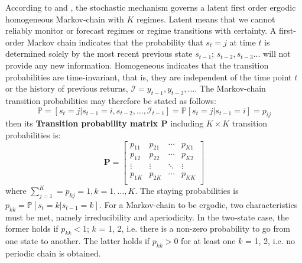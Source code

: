 \documentclass[12pt,a4paper]{article}
\begin{document}
According to \cite{hamilton1994autoregressive} and \cite{paolella2012mixture}, the stochastic mechanism governs a latent first order ergodic homogeneous Markov-chain with $K$ regimes. Latent means that we cannot reliably monitor or forecast regimes or regime transitions with certainty. A first-order Markov chain indicates that the probability that $s_t = j$ at time $t$ is determined solely by the most recent previous state $s_{t-1}$; $s_{t-2}, s_{t-3}...$ will not provide any new information. Homogeneous indicates that the transition probabilities are time-invariant, that is, they are independent of the time point $t$ or the history of previous returns, $\mathcal{I} = {y_{t-1}, y_{t-2}, \ldots}$. The Markov-chain transition probabilities may therefore be stated as follows:
\begin{equation}
    \mathbb{P} = [s_t = j \vert s_{t-1} = i, s_{t-2}, \ldots, \mathcal{I}_{t-1}] = \mathbb{P} [s_t = j \vert s_{t-1} = i] = p_{ij}  
\end{equation}
then its \textbf{Transition probability matrix P} including $K\times K$ transition probabilities is:
\begin{equation}
    \textbf{P} = \left[ {\begin{array}{cccc}
    p_{11} & p_{21} & \cdots & p_{K1}\\
    p_{12} & p_{22} & \cdots & p_{K2}\\
    \vdots & \vdots & \ddots & \vdots\\
    p_{1K} & p_{2K} & \cdots & p_{KK}\\
  \end{array} } \right]
\end{equation}
where $\sum_{j=1}^{K} = p_{kj} = 1, k = 1, \ldots , K$. The staying probabilities is $p_{kk} = \mathbb{P} [s_t = k \vert s_{t-1} = k]$. For a Markov-chain to be ergodic, two characteristics must be met, namely irreducibility and aperiodicity. In the two-state case, the former holds if $p_{kk} < 1$; $k$ = 1, 2, i.e. there is a non-zero probability to go from one state to another. The latter holds if $p_{kk} > 0$ for at least one $k$ = 1, 2, i.e. no periodic chain is obtained.\par
\end{document}
